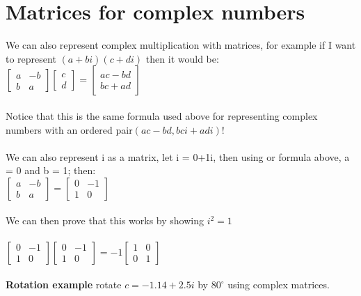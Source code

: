 \documentclass{article}
\begin{document}
\section{Matrices for complex numbers}
We can also represent complex multiplication with matrices, for example if I want to represent $(a+bi)(c+di)$ then it would be:\\
$\begin{bmatrix}
a & -b\\
b & a
\end{bmatrix}\begin{bmatrix}
c \\
d
\end{bmatrix}=\begin{bmatrix}
ac-bd \\
bc+ad
\end{bmatrix}$\\\\
Notice that this is the same formula used above for representing complex numbers with an ordered pair$(ac-bd,bci+adi)$!\\\\
We can also represent i as a matrix, let i = 0+1i, then using or formula above, a = 0 and b = 1; then:\\
$\begin{bmatrix}
a & -b\\
b & a
\end{bmatrix}=\begin{bmatrix}
0 & -1\\
1 & 0
\end{bmatrix}$\\\\
We can then prove that this works by showing $i^2=1$\\\\
$\begin{bmatrix}
0 & -1\\
1 & 0
\end{bmatrix}\begin{bmatrix}
0 & -1\\
1 & 0
\end{bmatrix}=-1\begin{bmatrix}
1 & 0\\
0 & 1
\end{bmatrix}$\\\\
\textbf{Rotation example}
rotate $c=-1.14+2.5i$ by $80^\circ$ using complex matrices.\\
\end{document}
